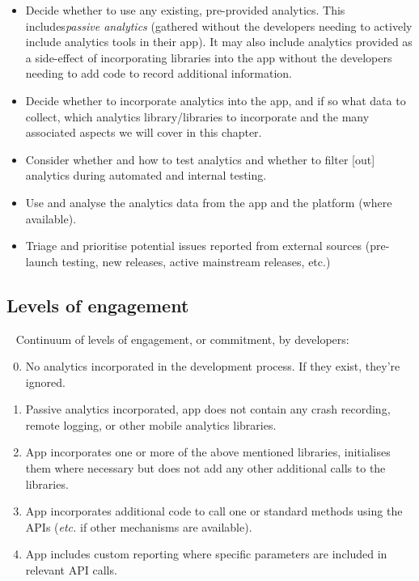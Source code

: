 \begin{itemize}
    \item Decide whether to use any existing, pre-provided analytics. This includes\emph{passive analytics} (gathered without the developers needing to actively include analytics tools in their app). It may also include analytics provided as a side-effect of incorporating libraries into the app without the developers needing to add code to record additional information. 
    \item Decide whether to incorporate analytics into the app, and if so what data to collect, which analytics library/libraries to incorporate and the many associated aspects we will cover in this chapter.
    \item Consider whether and how to test analytics and whether to filter [out] analytics during automated and internal testing.
    \item Use and analyse the analytics data from the app and the platform (where available).
    \item Triage and prioritise potential issues reported from external sources (pre-launch testing, new releases, active mainstream releases, etc.)
\end{itemize}

\subsection{Levels of engagement}~\label{subsection-levels-of-engagement}
Continuum of levels of engagement, or commitment, by developers:
\begin{enumerate}
    \setcounter{enumi}{-1} %
    \item No analytics incorporated in the development process. If they exist, they're ignored.
    \item Passive analytics incorporated, app does not contain any crash recording, remote logging, or other mobile analytics libraries.
    \item App incorporates one or more of the above mentioned libraries, initialises them where necessary but does not add any other additional calls to the libraries.
    \item App incorporates additional code to call one or standard methods using the APIs (\emph{etc.} if other mechanisms are available).
    \item App includes custom reporting where specific parameters are included in relevant API calls.
\end{enumerate}

